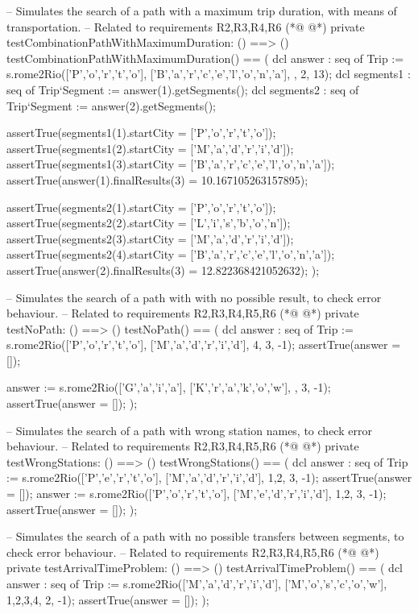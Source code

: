 \begin{vdmpp}[breaklines=true]
 -- Simulates the search of a path with a maximum trip duration, with means of transportation.
 -- Related to requirements R2,R3,R4,R6
(*@
\label{testCombinationPathWithMaximumDuration:113}
@*)
 private testCombinationPathWithMaximumDuration: () ==> ()
 testCombinationPathWithMaximumDuration() == (
   dcl answer : seq of Trip := s.rome2Rio(['P','o','r','t','o'], ['B','a','r','c','e','l','o','n','a'], {}, 2, 13);
   dcl segments1 : seq of Trip`Segment := answer(1).getSegments();
   dcl segments2 : seq of Trip`Segment := answer(2).getSegments();
   
   assertTrue(segments1(1).startCity = ['P','o','r','t','o']);
   assertTrue(segments1(2).startCity = ['M','a','d','r','i','d']);
   assertTrue(segments1(3).startCity = ['B','a','r','c','e','l','o','n','a']);
   assertTrue(answer(1).finalResults(3) = 10.167105263157895);
   
   assertTrue(segments2(1).startCity = ['P','o','r','t','o']);
   assertTrue(segments2(2).startCity = ['L','i','s','b','o','n']);
   assertTrue(segments2(3).startCity = ['M','a','d','r','i','d']);
   assertTrue(segments2(4).startCity = ['B','a','r','c','e','l','o','n','a']);
   assertTrue(answer(2).finalResults(3) = 12.822368421052632);
 );
 
 -- Simulates the search of a path with with no possible result, to check error behaviour.
 -- Related to requirements R2,R3,R4,R5,R6
(*@
\label{testNoPath:133}
@*)
 private testNoPath: () ==> ()
 testNoPath() == (
   dcl answer : seq of Trip := s.rome2Rio(['P','o','r','t','o'], ['M','a','d','r','i','d'], {4}, 3, -1);
   assertTrue(answer = []);
   
   answer := s.rome2Rio(['G','a','i','a'], ['K','r','a','k','o','w'], {}, 3, -1);
   assertTrue(answer = []);
 );
 
 -- Simulates the search of a path with wrong station names, to check error behaviour.
 -- Related to requirements R2,R3,R4,R5,R6
(*@
\label{testWrongStations:144}
@*)
 private testWrongStations: () ==> ()
 testWrongStations() == (
   dcl answer : seq of Trip := s.rome2Rio(['P','e','r','t','o'], ['M','a','d','r','i','d'], {1,2}, 3, -1);
   assertTrue(answer = []);
   answer := s.rome2Rio(['P','o','r','t','o'], ['M','e','d','r','i','d'], {1,2}, 3, -1);
   assertTrue(answer = []);
 );
 
 -- Simulates the search of a path with no possible transfers between segments, to check error behaviour.
 -- Related to requirements R2,R3,R4,R5,R6
(*@
\label{testArrivalTimeProblem:154}
@*)
 private testArrivalTimeProblem: () ==> ()
 testArrivalTimeProblem() == (
   dcl answer : seq of Trip := s.rome2Rio(['M','a','d','r','i','d'], ['M','o','s','c','o','w'], {1,2,3,4}, 2, -1);
   assertTrue(answer = []);
 );
 

\end{vdmpp}
